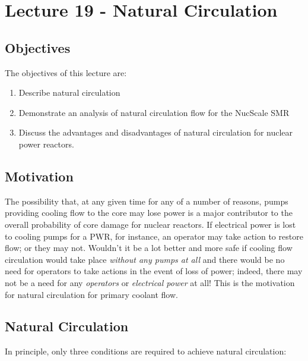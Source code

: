 \chapter{Lecture 19 - Natural Circulation}
\label{ch:ch19}
\section{Objectives}
The objectives of this lecture are:
\begin{enumerate}
\item Describe natural circulation 
\item Demonstrate an analysis of natural circulation flow for the NucScale SMR
\item Discuss the advantages and disadvantages of natural circulation for nuclear power reactors.
\end{enumerate}

\section{Motivation}
The possibility that, at any given time for any of a number of reasons, pumps providing cooling flow to the core may lose power is a major contributor to the overall probability of core damage for nuclear reactors. If electrical power is lost to cooling pumps for a PWR, for instance, an operator may take action to restore flow; or they may not.  Wouldn't it be a lot better and more safe if cooling flow circulation would take place \emph{without any pumps at all} and there would be no need for operators to take actions in the event of loss of power; indeed, there may not be a need for any \emph{operators} or \emph{electrical power} at all!  This is the motivation for natural circulation for primary coolant flow.  

\section{Natural Circulation} 

In principle, only three conditions are required to achieve natural circulation:

